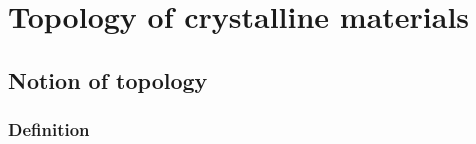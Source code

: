 \documentclass[main.tex]{subfiles}
\begin{document}
	
\chapter{Topology of crystalline materials}
\vspace*{-1\baselineskip}
\label{topology}







%
%
%
%
%
%
%
%
%

%
%
%
%


\section{Notion of topology}

\subsection{Definition}
\end{document}
